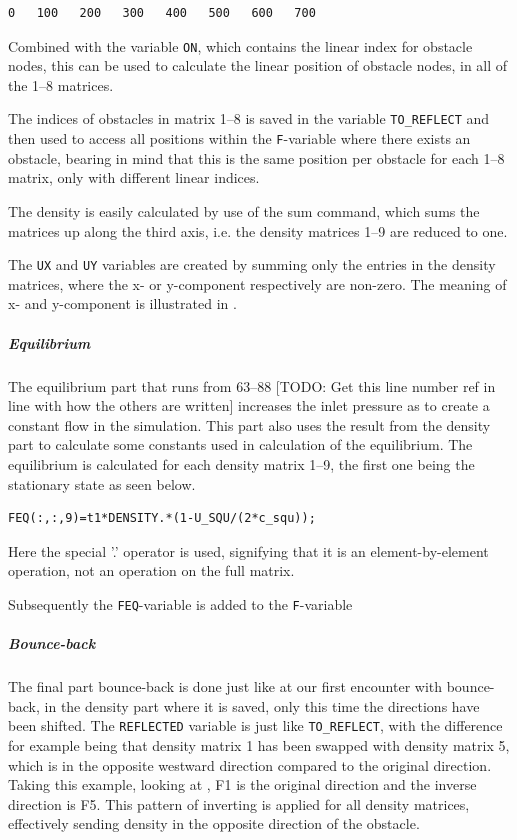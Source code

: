 \begin{verbatim}
0   100   200   300   400   500   600   700
\end{verbatim}

Combined with the variable \texttt{ON}, which contains the linear index for obstacle nodes, this can be used to calculate the linear position of obstacle nodes, in all of the 1--8 matrices.

The indices of obstacles in matrix 1--8 is saved in the variable \texttt{TO\_REFLECT} and then used to access all positions within the \texttt{F}-variable where there exists an obstacle, bearing in mind that this is the same position per obstacle for each 1--8 matrix, only with different linear indices.

The density is easily calculated by use of the sum command, which sums the matrices up along the third axis, i.e. the density matrices 1--9 are reduced to one.

The \texttt{UX} and \texttt{UY} variables are created by summing only the entries in the density matrices, where the x- or y-component respectively are non-zero. The meaning of x- and y-component is illustrated in .


\subparagraph*{Equilibrium}
The equilibrium part that runs from 63--88 [TODO: Get this line number ref in line with how the others are written] increases the inlet pressure as to create a constant flow in the simulation. This part also uses the result from the density part to calculate some constants used in calculation of the equilibrium. The equilibrium is calculated for each density matrix 1--9, the first one being the stationary state as seen below.

\begin{verbatim}
FEQ(:,:,9)=t1*DENSITY.*(1-U_SQU/(2*c_squ));
\end{verbatim}

Here the special '.' operator is used, signifying that it is an element-by-element operation, not an operation on the full matrix.

Subsequently the \texttt{FEQ}-variable is added to the \texttt{F}-variable

\subparagraph*{Bounce-back}
The final part bounce-back is done just like at our first encounter with bounce-back, in the density part where it is saved, only this time the directions have been shifted. The \texttt{REFLECTED} variable is just like \texttt{TO\_REFLECT}, with the difference for example being that density matrix 1 has been swapped with density matrix 5, which is in the opposite westward direction compared to the original direction. Taking this example, looking at , F1 is the original direction and the inverse direction is F5. This pattern of inverting is applied for all density matrices, effectively sending density in the opposite direction of the obstacle.



